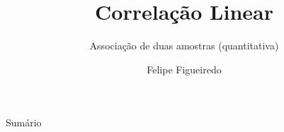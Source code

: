 \documentclass{beamer}
\title%
{Correlação Linear}
\subtitle
{Associação de duas amostras (quantitativa)} %
\author%
{Felipe Figueiredo}%
\institute[INTO] %
{Instituto Nacional de Traumatologia e Ortopedia
}
\date%
{}
\begin{document}
\begin{frame}
  \titlepage
\end{frame}

\begin{frame}{Sumário}
  \tableofcontents
\end{frame}








\end{document}
